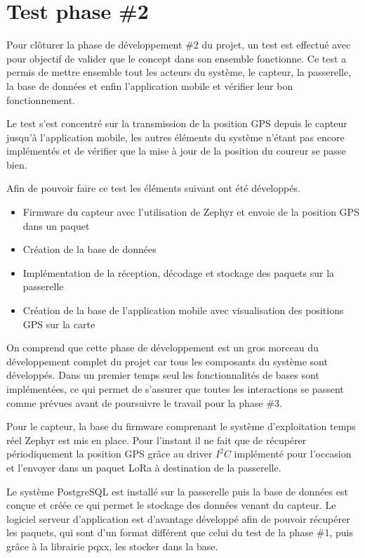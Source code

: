 
\chapter{Test phase \#2}\label{ch:test_2}

Pour clôturer la phase de développement \#2 du projet, un test est effectué avec pour objectif de valider que le concept dans son ensemble fonctionne. Ce test a permis de mettre ensemble tout les acteurs du système, le capteur, la passerelle, la base de données et enfin l'application mobile et vérifier leur bon fonctionnement.

Le test s'est concentré sur la transmission de la position GPS depuis le capteur jusqu'à l'application mobile, les autres éléments du système n'étant pas encore implémentés et de vérifier que la mise à jour de la position du coureur se passe bien.

Afin de pouvoir faire ce test les éléments suivant ont été développés.

\begin{itemize}
\item Firmware du capteur avec l'utilisation de Zephyr et envoie de la position GPS dans un paquet
\item Création de la base de données
\item Implémentation de la réception, décodage et stockage des paquets sur la passerelle
\item Création de la base de l'application mobile avec visualisation des positions GPS sur la carte
\end{itemize}

On comprend que cette phase de développement est un gros morceau du développement complet du projet car tous les composants du système sont développés. Dans un premier temps seul les fonctionnalités de bases sont implémentées, ce qui permet de s'assurer que toutes les interactions se passent comme prévues avant de poursuivre le travail pour la phase \#3.

Pour le capteur, la base du firmware comprenant le système d'exploitation temps réel Zephyr est mis en place. Pour l'instant il ne fait que de récupérer périodiquement la position GPS grâce au driver $I^{2}C$ implémenté pour l'occasion et l'envoyer dans un paquet LoRa à destination de la passerelle.

Le système PostgreSQL est installé sur la passerelle puis la base de données est conçue et créée ce qui permet le stockage des données venant du capteur. Le logiciel serveur d'application est d'avantage développé afin de pouvoir récupérer les paquets, qui sont d'un format différent que celui du test de la phase \#1, puis grâce à la librairie pqxx, les stocker dans la base.

